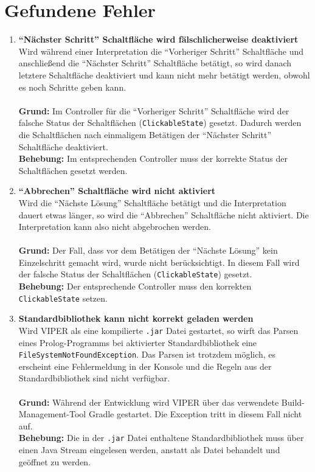 \documentclass[parskip=full,11pt,twoside]{scrartcl}
\begin{document}
\section{Gefundene Fehler}

\begin{enumerate}[label=\#\arabic*]
  \item \textbf{\enquote{Nächster Schritt} Schaltfläche wird fälschlicherweise deaktiviert}\\
        Wird während einer Interpretation die \enquote{Vorheriger Schritt} Schaltfläche und anschließend die \enquote{Nächster Schritt} Schaltfläche betätigt, so wird danach letztere Schaltfläche deaktiviert und kann nicht mehr betätigt werden, obwohl es noch Schritte geben kann.\\\\
        \textbf{Grund:} Im Controller für die \enquote{Vorheriger Schritt} Schaltfläche wird der falsche Status der Schaltflächen (\texttt{ClickableState}) gesetzt. Dadurch werden die Schaltflächen nach einmaligem Betätigen der \enquote{Nächster Schritt} Schaltfläche deaktiviert.\\
        \textbf{Behebung:} Im entsprechenden Controller muss der korrekte Status der Schaltflächen gesetzt werden.

  \item \textbf{\enquote{Abbrechen} Schaltfläche wird nicht aktiviert}\\
        Wird die \enquote{Nächste Lösung} Schaltfläche betätigt und die Interpretation dauert etwas länger, so wird die \enquote{Abbrechen} Schaltfläche nicht aktiviert. Die Interpretation kann also nicht abgebrochen werden.\\\\
        \textbf{Grund:} Der Fall, dass vor dem Betätigen der \enquote{Nächste Lösung} kein Einzelschritt gemacht wird, wurde nicht berücksichtigt. In diesem Fall wird der falsche Status der Schaltflächen (\texttt{ClickableState}) gesetzt.\\
        \textbf{Behebung:} Der entsprechende Controller muss den korrekten \texttt{ClickableState} setzen.

  \item \textbf{Standardbibliothek kann nicht korrekt geladen werden}\\
        Wird VIPER als eine kompilierte \texttt{.jar} Datei gestartet, so wirft das Parsen eines Prolog-Programms bei aktivierter Standardbibliothek eine \texttt{FileSystemNotFoundException}. Das Parsen ist trotzdem möglich, es erscheint eine Fehlermeldung in der Konsole und die Regeln aus der Standardbibliothek sind nicht verfügbar.\\\\
        \textbf{Grund:} Während der Entwicklung wird VIPER über das verwendete Build-Management-Tool Gradle gestartet. Die Exception tritt in diesem Fall nicht auf.\\
        \textbf{Behebung:} Die in der \texttt{.jar} Datei enthaltene Standardbibliothek muss über einen Java Stream eingelesen werden, anstatt als Datei behandelt und geöffnet zu werden.


\end{enumerate}
\end{document}
